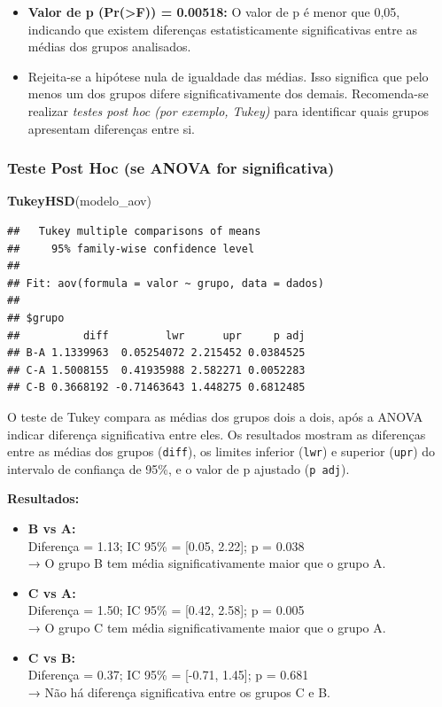 \documentclass[
]{book}
\newenvironment{Shaded}{\begin{snugshade}}{\end{snugshade}}
\newcommand{\FunctionTok}[1]{\textcolor[rgb]{0.13,0.29,0.53}{\textbf{#1}}}
\newcommand{\NormalTok}[1]{#1}
\begin{document}
\begin{itemize}
\item
  \textbf{Valor de p (Pr(\textgreater F)) = 0.00518:} O valor de p é menor que 0,05, indicando que existem diferenças estatisticamente significativas entre as médias dos grupos analisados.
\item
  Rejeita-se a hipótese nula de igualdade das médias. Isso significa que pelo menos um dos grupos difere significativamente dos demais. Recomenda-se realizar \emph{testes post hoc (por exemplo, Tukey)} para identificar quais grupos apresentam diferenças entre si.
\end{itemize}

\subsubsection{Teste Post Hoc (se ANOVA for significativa)}\label{teste-post-hoc-se-anova-for-significativa}

\begin{Shaded}
\begin{Highlighting}[]
\FunctionTok{TukeyHSD}\NormalTok{(modelo\_aov)}
\end{Highlighting}
\end{Shaded}

\begin{verbatim}
##   Tukey multiple comparisons of means
##     95% family-wise confidence level
## 
## Fit: aov(formula = valor ~ grupo, data = dados)
## 
## $grupo
##          diff         lwr      upr     p adj
## B-A 1.1339963  0.05254072 2.215452 0.0384525
## C-A 1.5008155  0.41935988 2.582271 0.0052283
## C-B 0.3668192 -0.71463643 1.448275 0.6812485
\end{verbatim}

O teste de Tukey compara as médias dos grupos dois a dois, após a ANOVA indicar diferença significativa entre eles. Os resultados mostram as diferenças entre as médias dos grupos (\texttt{diff}), os limites inferior (\texttt{lwr}) e superior (\texttt{upr}) do intervalo de confiança de 95\%, e o valor de p ajustado (\texttt{p\ adj}).

\textbf{Resultados:}

\begin{itemize}
\item
  \textbf{B vs A:}\\
  Diferença = 1.13; IC 95\% = {[}0.05, 2.22{]}; p = 0.038\\
  → O grupo B tem média significativamente maior que o grupo A.
\item
  \textbf{C vs A:}\\
  Diferença = 1.50; IC 95\% = {[}0.42, 2.58{]}; p = 0.005\\
  → O grupo C tem média significativamente maior que o grupo A.
\item
  \textbf{C vs B:}\\
  Diferença = 0.37; IC 95\% = {[}-0.71, 1.45{]}; p = 0.681\\
  → Não há diferença significativa entre os grupos C e B.
\end{itemize}
\end{document}
